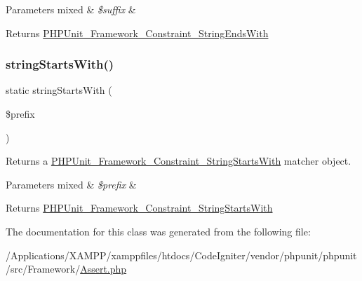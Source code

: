 \begin{DoxyParams}[1]{Parameters}
mixed & {\em \$suffix} & \\
\hline
\end{DoxyParams}
\begin{DoxyReturn}{Returns}
\mbox{\hyperlink{class_p_h_p_unit___framework___constraint___string_ends_with}{P\+H\+P\+Unit\+\_\+\+Framework\+\_\+\+Constraint\+\_\+\+String\+Ends\+With}} 
\end{DoxyReturn}
\mbox{\label{class_p_h_p_unit___framework___assert_a3dd7a179f44c7ef8a8e2ece6daea222f}} 
\subsubsection{\texorpdfstring{string\+Starts\+With()}{stringStartsWith()}}
{\footnotesize\ttfamily static string\+Starts\+With (\begin{DoxyParamCaption}\item[{}]{\$prefix }\end{DoxyParamCaption})\hspace{0.3cm}{\ttfamily [static]}}

Returns a \mbox{\hyperlink{class_p_h_p_unit___framework___constraint___string_starts_with}{P\+H\+P\+Unit\+\_\+\+Framework\+\_\+\+Constraint\+\_\+\+String\+Starts\+With}} matcher object.


\begin{DoxyParams}[1]{Parameters}
mixed & {\em \$prefix} & \\
\hline
\end{DoxyParams}
\begin{DoxyReturn}{Returns}
\mbox{\hyperlink{class_p_h_p_unit___framework___constraint___string_starts_with}{P\+H\+P\+Unit\+\_\+\+Framework\+\_\+\+Constraint\+\_\+\+String\+Starts\+With}} 
\end{DoxyReturn}


The documentation for this class was generated from the following file\+:\begin{DoxyCompactItemize}
\item 
/\+Applications/\+X\+A\+M\+P\+P/xamppfiles/htdocs/\+Code\+Igniter/vendor/phpunit/phpunit/src/\+Framework/\mbox{\hyperlink{phpunit_2phpunit_2src_2_framework_2_assert_8php}{Assert.\+php}}\end{DoxyCompactItemize}
